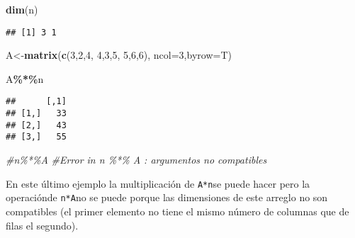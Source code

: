 \documentclass[
]{article}
\newenvironment{Shaded}{\begin{snugshade}}{\end{snugshade}}
\newcommand{\CommentTok}[1]{\textcolor[rgb]{0.56,0.35,0.01}{\textit{#1}}}
\newcommand{\DataTypeTok}[1]{\textcolor[rgb]{0.13,0.29,0.53}{#1}}
\newcommand{\DecValTok}[1]{\textcolor[rgb]{0.00,0.00,0.81}{#1}}
\newcommand{\KeywordTok}[1]{\textcolor[rgb]{0.13,0.29,0.53}{\textbf{#1}}}
\newcommand{\NormalTok}[1]{#1}
\newcommand{\OperatorTok}[1]{\textcolor[rgb]{0.81,0.36,0.00}{\textbf{#1}}}
\begin{document}
\begin{Shaded}
\begin{Highlighting}[]
\KeywordTok{dim}\NormalTok{(n)}
\end{Highlighting}
\end{Shaded}

\begin{verbatim}
## [1] 3 1
\end{verbatim}

\begin{Shaded}
\begin{Highlighting}[]
\NormalTok{A\textless{}{-}}\KeywordTok{matrix}\NormalTok{(}\KeywordTok{c}\NormalTok{(}\DecValTok{3}\NormalTok{,}\DecValTok{2}\NormalTok{,}\DecValTok{4}\NormalTok{,}
            \DecValTok{4}\NormalTok{,}\DecValTok{3}\NormalTok{,}\DecValTok{5}\NormalTok{,}
            \DecValTok{5}\NormalTok{,}\DecValTok{6}\NormalTok{,}\DecValTok{6}\NormalTok{), }\DataTypeTok{ncol=}\DecValTok{3}\NormalTok{,}\DataTypeTok{byrow=}\NormalTok{T)}

\NormalTok{A}\OperatorTok{\%*\%}\NormalTok{n}
\end{Highlighting}
\end{Shaded}

\begin{verbatim}
##      [,1]
## [1,]   33
## [2,]   43
## [3,]   55
\end{verbatim}

\begin{Shaded}
\begin{Highlighting}[]
\CommentTok{\#n\%*\%A}
\CommentTok{\#Error in n \%*\% A : argumentos no compatibles}
\end{Highlighting}
\end{Shaded}

En este último ejemplo la multiplicación de \texttt{A*n}se puede hacer
pero la operaciónde \texttt{n*A}no se puede porque las dimensiones de
este arreglo no son compatibles (el primer elemento no tiene el mismo
número de columnas que de filas el segundo).
\end{document}
